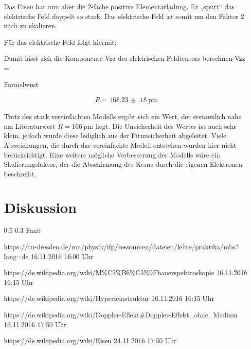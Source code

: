 \documentclass[german, %
parskip=full, %
bibliography=totoc, %
]{scrartcl}
\makeatletter
\renewcommand\subsection{\@startsection 
   {subsection}{2}{0mm}%
   {0.5\baselineskip}%
   {0.3\baselineskip}%
   {\bfseries\sffamily\large}%
   }
\makeatother
\begin{document}
Das Eisen hat nun aber die 2-fache positive Elementarladung. Er „spürt“ das elektrische Feld doppelt so stark. Das elektrische Feld ist somit um den Faktor 2 nach zu skalieren.

Für das elektrische Feld folgt hiermit:

Damit lässt sich die Komponente Vzz des elektrischen Feldtensors berechnen
Vzz =

Formelwust

\begin{align*}
R = \SI[separate-uncertainty = true]{168.23(18)}{\pico\meter}
\end{align*}

Trotz des stark vereinfachten Modells ergibt sich ein Wert, der erstaunlich nahe am Literaturwert $R = \SI{166}{\pico\meter}$ liegt. Die Unsicherheit des Wertes ist auch sehr klein, jedoch wurde diese lediglich aus der Fitunsicherheit abgeleitet. Viele Abweichungen, die durch das vereinfachte Modell entstehen wurden hier nicht berücksichtigt. Eine weitere mögliche Verbesserung des Modells wäre ein Skalierungsfaktor, der die Abschirmung des Kerns durch die eigenen Elektronen beschreibt.

\section{Diskussion}

\subsection{Fazit}



\begin{thebibliography}{9}

  https://tu-dresden.de/mn/physik/ifp/ressourcen/dateien/lehre/praktika/mbs?lang=de
	16.11.2016
	16:00 Uhr
	
  https://de.wikipedia.org/wiki/M\%C3\%B6\%C3\%9Fbauerspektroskopie
	16.11.2016
	16:15 Uhr
	
  https://de.wikipedia.org/wiki/Hyperfeinstruktur
	16.11.2016
	16:15 Uhr
	
  https://de.wikipedia.org/wiki/Doppler-Effekt\#Doppler-Effekt\_ohne\_Medium
	16.11.2016
	17:50 Uhr
	
  https://de.wikipedia.org/wiki/Eisen
	24.11.2016
	17:50 Uhr

\end{thebibliography}
\end{document}
